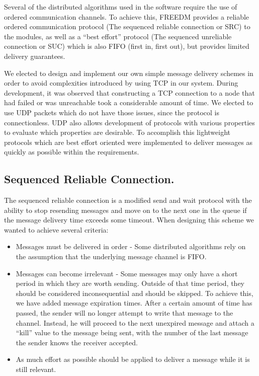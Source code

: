 Several of the distributed algorithms used in the software require the use of ordered communication channels. To achieve this, FREEDM provides a reliable ordered communication protocol (The sequenced reliable connection or SRC) to the modules, as well as a ``best effort'' protocol (The sequenced unreliable connection or SUC) which is also FIFO (first in, first out), but provides limited delivery guarantees.

We elected to design and implement our own simple message delivery schemes in order to avoid complexities introduced by using TCP in our system. During development, it was observed that constructing a TCP connection to a node that had failed or was unreachable took a considerable amount of time. We elected to use UDP packets which do not have those issues, since the protocol is connectionless. UDP also allows development of protocols with various properties to evaluate which properties are desirable. To accomplish this lightweight protocols which are best effort oriented were implemented to deliver messages as quickly as possible within the requirements.

\subsection{Sequenced Reliable Connection.}

The sequenced reliable connection is a modified send and wait protocol with the 
ability to stop resending messages and move on to the next one in the queue if 
the message delivery time exceeds some timeout. When designing this scheme we
wanted to achieve several criteria:

\begin{itemize}
\item Messages must be delivered in order - Some distributed algorithms rely on 
the assumption that the underlying message channel is FIFO.
\item Messages can become irrelevant - Some messages may only have a short 
period in which they are worth sending. Outside of that time period, they 
should be considered inconsequential and should be skipped. To achieve this, we 
have added message expiration times. After a certain amount of time has passed, 
the sender will no longer attempt to write that message to the channel. 
Instead, he will proceed to the next unexpired message and attach a ``kill'' 
value to the message being sent, with the number of the last message the sender 
knows the receiver accepted.
\item As much effort as possible should be applied to deliver a message while 
it is still relevant.
\end{itemize}

